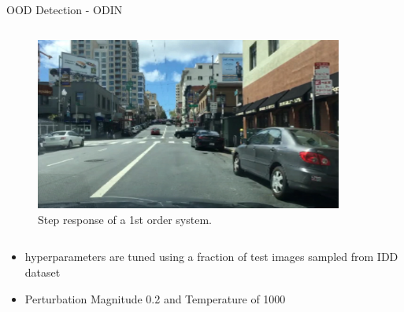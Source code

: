 \documentclass[10pt, aspectratio=169]{beamer}
\begin{document}
\begin{frame}[allowframebreaks]{OOD Detection - ODIN}
\begin{columns}[c]
            \begin{column}{.33\textwidth}
                \begin{figure}
                    \centering
                    \includegraphics[width=0.9\textwidth]{images/image_0.005_10.png}
                    \caption{Step response of a 1st order system.}
                \end{figure}
                \end{column}
        \end{columns}

        \begin{itemize}
            \item hyperparameters are tuned using a fraction of test images sampled from IDD dataset
            \item Perturbation Magnitude 0.2 and Temperature of 1000
        \end{itemize}

        \framebreak


\end{frame}
\end{document}
